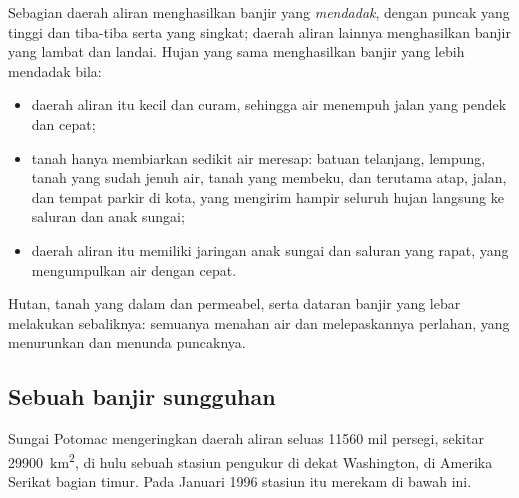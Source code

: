 Sebagian daerah aliran menghasilkan banjir yang \emph{mendadak}, dengan puncak
yang tinggi dan tiba-tiba serta  yang singkat; daerah aliran
lainnya menghasilkan banjir yang lambat dan landai. Hujan yang sama
menghasilkan banjir yang lebih mendadak bila:
\begin{itemize}
  \item daerah aliran itu kecil dan curam, sehingga air menempuh jalan yang
        pendek dan cepat;
  \item tanah hanya membiarkan sedikit air meresap: batuan telanjang,
        lempung, tanah yang sudah jenuh air, tanah yang membeku, dan terutama
        atap, jalan, dan tempat parkir di kota, yang mengirim hampir seluruh
        hujan langsung ke saluran dan anak sungai;
  \item daerah aliran itu memiliki jaringan anak sungai dan saluran yang
        rapat, yang mengumpulkan air dengan cepat.
\end{itemize}
Hutan, tanah yang dalam dan permeabel, serta dataran banjir yang lebar
melakukan sebaliknya: semuanya menahan air dan melepaskannya perlahan, yang
menurunkan dan menunda puncaknya.

\subsection*{Sebuah banjir sungguhan}

Sungai Potomac mengeringkan daerah aliran seluas \num{11560} mil persegi,
sekitar \qty{29900}{km^2}, di hulu sebuah stasiun pengukur  di dekat
Washington, di Amerika Serikat bagian timur. Pada Januari 1996 stasiun itu
merekam  di bawah ini.

